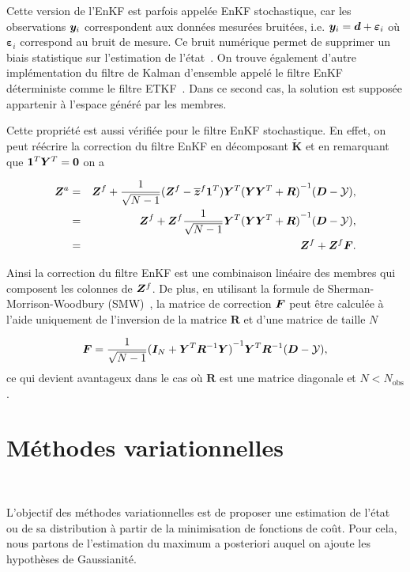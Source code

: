 Cette version de l'EnKF est parfois appelée EnKF stochastique, car les observations $\bm{y}_i$ correspondent aux données mesurées bruitées, i.e. $\bm{y}_i = \bm{d} + \bm \varepsilon_i$ où $\bm \varepsilon_i$ correspond au bruit de mesure. Ce bruit numérique permet de supprimer un biais statistique sur l'estimation de l'état~\cite{van_leeuwen_consistent_2020}. On trouve également d'autre implémentation du filtre de Kalman d'ensemble appelé le filtre EnKF déterministe comme le filtre ETKF~\cite{bishop_adaptive_2001, Hunt2007}. Dans ce second cas, la solution est supposée appartenir à l'espace généré par les membres.

Cette propriété est aussi vérifiée pour le filtre EnKF stochastique. En effet, on peut réécrire la correction du filtre EnKF en décomposant $\tilde{\bm{K}}$ et en remarquant que $\bm 1^T \bm Y^T = \bm 0$ on a

\begin{eqnarray*}
    \bm{Z}^a &=& \bm{Z}^f + \frac{1}{\sqrt{N - 1}}(\bm Z^f - \overline{\bm{z}}^f \bm{1}^T)\bm Y^T {(\bm Y \bm Y^T + \bm R)}^{-1} ( \bm{D} - \mathcal{Y}), \\
    &=& \bm{Z}^f +\bm Z^f  \frac{1}{\sqrt{N - 1}}\bm Y^T {(\bm Y \bm Y^T + \bm R)}^{-1} ( \bm{D} - \mathcal{Y}), \\
    &=& \bm{Z}^f +\bm Z^f \bm{F}.
\end{eqnarray*}

Ainsi la correction du filtre EnKF est une combinaison linéaire des membres qui composent les colonnes de $\bm{Z}^f$. De plus, en utilisant la formule de Sherman-Morrison-Woodbury (SMW)~\cite{SMW}, la matrice de correction $\bm{F}$ peut être calculée à l'aide uniquement de l'inversion de la matrice $\bm R$ et d'une matrice de taille $N$

\begin{eqnarray*}
    \bm{F} = \frac{1}{\sqrt{N - 1}} {(\bm I_N + \bm Y^T\bm R^{-1}\bm Y)}^{-1}\bm Y^T \bm R^{-1} (\bm{D} - \mathcal{Y}),
\end{eqnarray*}ce qui devient avantageux dans le cas où $\bm R$ est une matrice diagonale et $N < N_{\text{obs}}$.

\section{Méthodes variationnelles}~\label{sec:variation}

L'objectif des méthodes variationnelles est de proposer une estimation de l'état ou de sa distribution à partir de la minimisation de fonctions de coût. Pour cela, nous partons de l'estimation du maximum a posteriori auquel on ajoute les hypothèses de Gaussianité.

